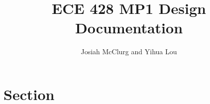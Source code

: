\documentclass[]{article}
\title{ECE 428 MP1 Design Documentation}
\author{Josiah McClurg and Yihua Lou}
\begin{document}
\maketitle

\begin{abstract}

\end{abstract}

\section{Section}
\end{document}
